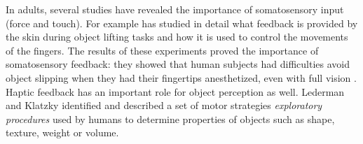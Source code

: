 In adults, several studies have revealed the importance of
somatosensory input (force and touch). For example
\cite{Johansson90Liffiing} has studied in detail what feedback
is provided by the skin during object lifting tasks and how it is
used to control the movements of the fingers. The results of these
experiments proved the importance of somatosensory feedback: they
showed that human subjects had difficulties avoid object slipping when
they had their fingertips anesthetized, even with full vision
\cite{johansson91how}. Haptic feedback has an important role for
object perception as well. Lederman and Klatzky \cite{klatzky87Hand}
identified and described a set of motor strategies
\emph{exploratory procedures} used by humans to determine properties
of objects such as shape, texture, weight or volume.







